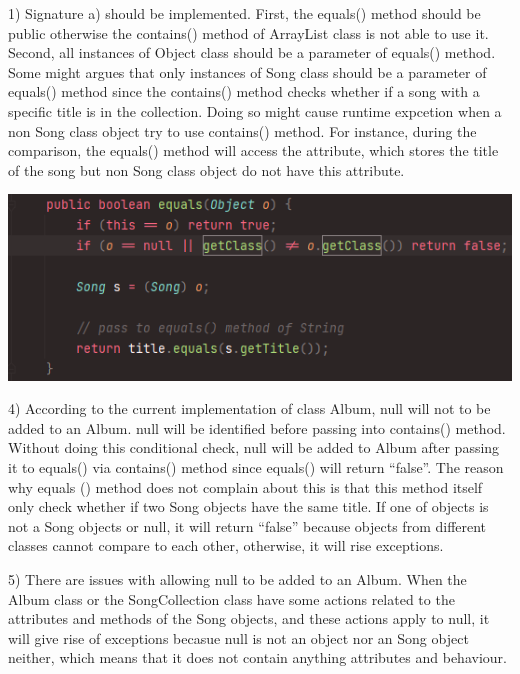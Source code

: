 \documentclass{article}
\begin{document}
1) Signature a) should be implemented. First, the equals() method should be public 
otherwise the contains() method of ArrayList class is not able to use it. Second, 
all instances of Object class should be a parameter of equals() method. Some might 
argues that only instances of Song class should be a parameter of equals() method 
since the contains() method checks whether if a song with a specific title is in 
the collection. Doing so might cause runtime expcetion when a non Song class object
try to use contains() method. For instance, during the comparison, the equals() method 
will access the attribute, which stores the title of the song but non Song class 
object do not have this attribute.

\includegraphics[width=\textwidth]{snippet.PNG}

4) According to the current implementation of class Album, null will not to be added to 
an Album. null will be identified before passing into contains() method. Without doing 
this conditional check, null will be added to Album after passing it to equals() 
via contains() method since equals() will return ``false''. The reason why equals
() method does not complain about this is that this method itself only check 
whether if two Song objects have the same title. If one of objects is not a Song 
objects or null, it will return ``false'' because objects from different classes 
cannot compare to each other, otherwise, it will rise exceptions.

5) There are issues with allowing null to be added to an Album. When the Album 
class or the SongCollection class have some actions related to the attributes 
and methods of the Song objects, and these actions apply to null, it will give
 rise of exceptions becasue null is not an object nor an Song object neither, 
 which means that it does not contain anything attributes and behaviour.
\end{document}
